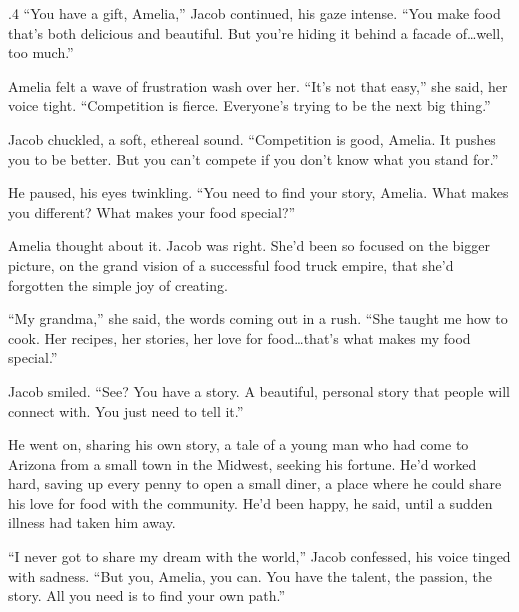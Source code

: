 \documentclass{article}
\newcommand{\baselinezs}{{\sc E2E$_{ZS}$}}
\begin{document}
\begin{tcolorbox}[colback=white, colframe=gray!30!white, coltitle=black, parskip=5mm, title=
    \textbf{System output: \baselinezs}, breakable]
\begin{spacing}{.4}
“You have a gift, Amelia,” Jacob continued, his gaze intense. “You make food that’s both delicious and beautiful. But you’re hiding it behind a facade of…well, too much.” \\\par

Amelia felt a wave of frustration wash over her. “It’s not that easy,” she said, her voice tight. “Competition is fierce. Everyone's trying to be the next big thing.” \\\par

Jacob chuckled, a soft, ethereal sound. “Competition is good, Amelia. It pushes you to be better. But you can't compete if you don't know what you stand for.” \\\par

He paused, his eyes twinkling. “You need to find your story, Amelia. What makes you different? What makes your food special?” \\\par

Amelia thought about it. Jacob was right. She’d been so focused on the bigger picture, on the grand vision of a successful food truck empire, that she’d forgotten the simple joy of creating.  \\\par

“My grandma,” she said, the words coming out in a rush. “She taught me how to cook. Her recipes, her stories, her love for food…that’s what makes my food special.” \\\par

Jacob smiled. “See? You have a story. A beautiful, personal story that people will connect with. You just need to tell it.” \\\par

He went on, sharing his own story, a tale of a young man who had come to Arizona from a small town in the Midwest, seeking his fortune. He’d worked hard, saving up every penny to open a small diner, a place where he could share his love for food with the community. He’d been happy, he said, until a sudden illness had taken him away. \\\par

“I never got to share my dream with the world,” Jacob confessed, his voice tinged with sadness. “But you, Amelia, you can. You have the talent, the passion, the story. All you need is to find your own path.” \\\par


\end{spacing}
\end{tcolorbox}
\end{document}

